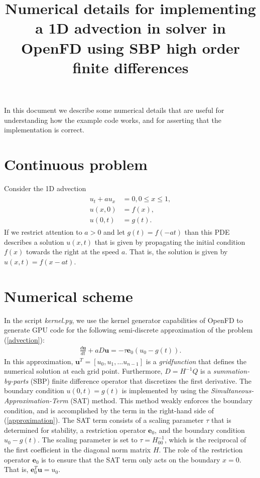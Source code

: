 \documentclass[a4paper]{article}
\title{Numerical details for implementing a 1D advection in solver in OpenFD
using SBP high order finite differences}
\newcommand{\ub}{\mathbf{u}}
\newcommand{\eb}{\mathbf{e}}
\begin{document}
\maketitle
In this document we describe some numerical details that are useful for
understanding how the example code works, and for asserting that the
implementation is correct.

\section{Continuous problem}
Consider the 1D advection
\begin{align}
        \begin{aligned}
        u_t + au_x &= 0, 0 \leq x \leq 1, \\
           u(x, 0) &= f(x), \\
           u(0, t) &= g(t).
        \end{aligned}
        \label{advection}
\end{align}
If we restrict attention to $a > 0$ and let $g(t) = f(-at)$ than this PDE
describes a solution $u(x, t)$ that is given by propagating the initial
condition $f(x)$ towards the right at the speed $a$.  That is, the solution is
given by $u(x, t) = f(x - at)$. 

\section{Numerical scheme}
In the script \emph{kernel.py}, we use the kernel generator capabilities of
OpenFD to generate GPU code for the following semi-discrete approximation of the
problem (\ref{advection}):
\begin{align}
        \frac{d\ub}{dt} + aD\ub = -\tau\eb_0(u_0 - g(t)).
        \label{approximation}
\end{align}
In this approximation,  $\ub^T = [u_0, u_1, \ldots u_{n-1}] $ is a
\emph{gridfunction} that defines the numerical solution at each grid point.
Furthermore, $D = H^{-1}Q$ is a \emph{summation-by-parts} (SBP) finite
difference operator that discretizes the first derivative. The boundary
condition $u(0, t) = g(t)$ is implemented by using the
\emph{Simultaneous-Approximation-Term} (SAT) method. This method weakly enforces
the boundary condition, and is accomplished by the term in the right-hand side
of (\ref{approximation}). The SAT term consists of a scaling parameter $\tau$
that is determined for stability, a restriction operator $\eb_0$, and the
boundary condition $u_0 - g(t)$. The scaling parameter is set to $\tau =
H_{00}^{-1}$, which is the reciprocal of the first coefficient in the diagonal
norm matrix $H$. The role of the restriction operator $\eb_0$ is to ensure that
the SAT term only acts on the boundary $x=0$. That is, $\eb_0^T\ub = u_0$.
\end{document}
